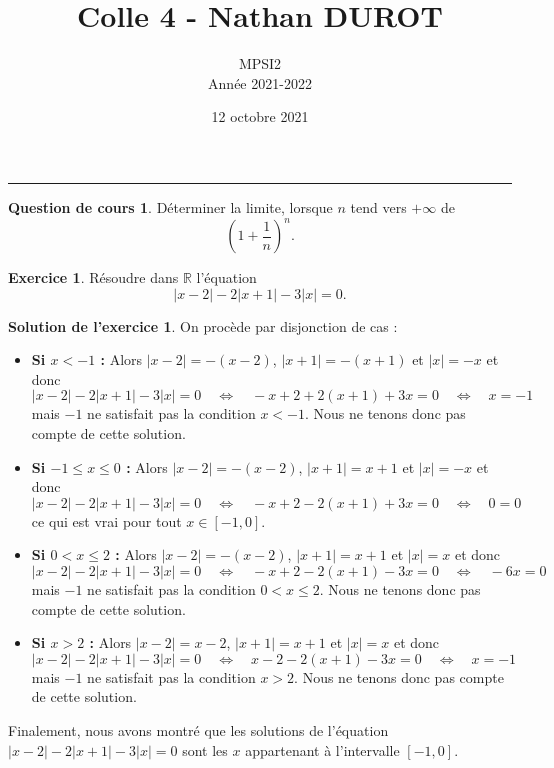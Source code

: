 \documentclass[a4paper, 11pt,openany]{article}%
\title{Colle 4 - Nathan DUROT}
\author{MPSI2\\
Année 2021-2022}
\date{12 octobre 2021}
\theoremstyle{plain}
\theoremstyle{definition}
\newtheorem{cours}{Question de cours}
\newtheorem{exo}{Exercice}
\newtheorem{sol}{Solution de l'exercice}
\theoremstyle{remark}
\newcommand{\R}{\mathbb{R}}
\begin{document}
   \maketitle
      \rule{\linewidth}{0.5mm}

\begin{cours}
Déterminer la limite, lorsque $n$ tend vers $+ \infty$ de 
\[ \left( 1 + \frac{1}{n} \right)^n.\]
\end{cours}

\begin{exo}
Résoudre dans $\R$ l'équation
\[ |x-2| - 2 |x+1| -3|x| = 0.\]
\end{exo}

\begin{sol}
On procède par disjonction de cas :
\begin{itemize}
\item \textbf{Si $x < -1$ :} Alors $|x-2| = -(x-2)$, $|x+1| = -(x+1)$ et $|x| = -x$ et donc 
\[|x-2| - 2 |x+1| -3|x| = 0  \quad \Leftrightarrow \quad
-x+2 + 2 (x+1)+3x = 0 \quad \Leftrightarrow \quad
x=-1 \]
mais $-1$ ne satisfait pas la condition $x < -1$. Nous ne tenons donc pas compte de cette solution.
\item \textbf{Si $-1 \leqslant x \leqslant 0$ :} Alors $|x-2| = -(x-2)$, $|x+1| = x+1$ et $|x| = -x$ et donc 
\[|x-2| - 2 |x+1| -3|x| = 0  \quad \Leftrightarrow \quad
-x+2 - 2 (x+1)+3x = 0 \quad \Leftrightarrow \quad
0=0 \]
ce qui est vrai pour tout $x \in [-1,0]$.
\item \textbf{Si $0 <  x \leqslant 2$ :} Alors $|x-2| = -(x-2)$, $|x+1| = x+1$ et $|x| = x$ et donc 
\[|x-2| - 2 |x+1| -3|x| = 0  \quad \Leftrightarrow \quad
-x+2 - 2 (x+1)-3x = 0 \quad \Leftrightarrow \quad
-6x=0 \]
mais $-1$ ne satisfait pas la condition $0 <  x \leqslant 2$. Nous ne tenons donc pas compte de cette solution.
\item \textbf{Si $x > 2$ :} Alors $|x-2| = x-2$, $|x+1| = x+1$ et $|x| = x$ et donc 
\[|x-2| - 2 |x+1| -3|x| = 0  \quad \Leftrightarrow \quad
x-2 - 2 (x+1)-3x = 0 \quad \Leftrightarrow \quad
x=-1 \]
mais $-1$ ne satisfait pas la condition $x > 2$. Nous ne tenons donc pas compte de cette solution.
\end{itemize}
Finalement, nous avons montré que les solutions de l'équation $|x-2| - 2 |x+1| -3|x| = 0$ sont les $ x$ appartenant à l'intervalle $[-1,0]$.
\end{sol}
\end{document}
